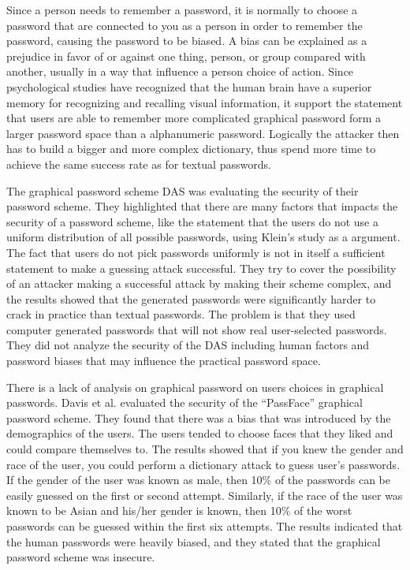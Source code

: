   Since a person needs to remember a password, it is normally to choose a password that are connected to you as a person in order to remember the password, causing the password to be biased. A bias can be explained as a prejudice in favor of or against one thing, person, or group compared with another, usually in a way that influence a person choice of action. Since psychological studies have recognized that the human brain have a superior memory for recognizing and recalling visual information, it support the statement that users are able to remember more complicated graphical password form a larger password space than a alphanumeric password. Logically the attacker then has to build a bigger and more complex dictionary, thus spend more time to achieve the same success rate as for textual passwords.

  The graphical password scheme DAS \cite{Jermyn} was evaluating the security of their password scheme. They highlighted that there are many factors that impacts the security of a password scheme, like the statement that the users do not use a uniform distribution of all possible passwords, using Klein's study \cite{UnixPasswords} as a argument. The fact that users do not pick passwords uniformly is not in itself a sufficient statement to make a guessing attack successful. They try to cover the possibility of an attacker making a successful attack by making their scheme complex, and the results showed that the generated passwords were significantly harder to crack in practice than textual passwords. The problem is that they used computer generated passwords that will not show real user-selected passwords. They did not analyze the security of the DAS including human factors and password biases that may influence the practical password space.

  There is a lack of analysis on graphical password on users choices in graphical passwords. Davis et al.\cite{Davis} evaluated the security of the ``PassFace'' graphical password scheme. They found that there was a bias that was introduced by the demographics of the users. The users tended to choose faces that they liked and could compare themselves to. The results showed that if you knew the gender and race of the user, you could perform a dictionary attack to guess user's passwords. If the gender of the user was known as male, then 10\% of the passwords can be easily guessed on the first or second attempt. Similarly, if the race of the user was known to be Asian and his/her gender is known, then 10\% of the worst passwords can be guessed within the first six attempts. The results indicated that the human passwords were heavily biased, and they stated that the graphical password scheme was insecure.

